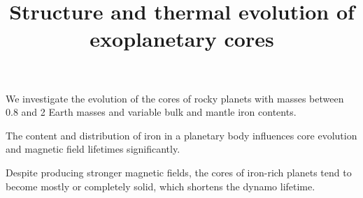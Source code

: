 \documentclass[draft]{agujournal2019} %
\newcommand{\irene}[1]{\textcolor{orange}{\textit{(Irene: #1)}}}
\begin{document}
%
%

\title{Structure and thermal evolution of exoplanetary cores}

%
%







\begin{keypoints}
\item We investigate the evolution of the cores of rocky planets with masses between 0.8 and 2 Earth masses and variable bulk and mantle iron contents.
\item The content and distribution of iron in a planetary body influences core evolution and magnetic field lifetimes significantly. 
\item Despite producing stronger magnetic fields, the cores of iron-rich planets tend to become mostly or completely solid, which shortens the dynamo lifetime.
\end{keypoints}
\end{document}
